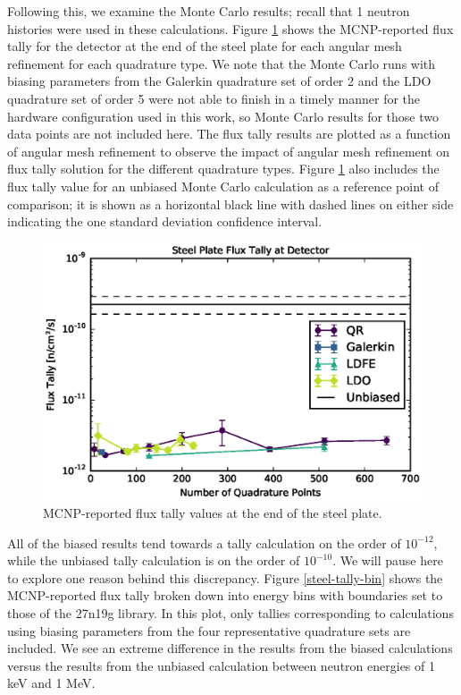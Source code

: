 \clearpage
Following this, we examine the Monte Carlo results; recall that 1 neutron histories were
used in these calculations. Figure \ref{steel-cad-tally} shows
the MCNP-reported flux tally for the detector at the end of the steel plate for each
angular mesh refinement for each quadrature type. We note that the Monte Carlo runs
with biasing parameters from the Galerkin quadrature set of order 2 and the LDO
quadrature set of order 5 were not able to finish in a timely manner for the hardware
configuration used in this work, so Monte Carlo results for those two data points are
not included here. The flux tally results are plotted as a function of angular mesh 
refinement to observe the impact of angular mesh refinement on flux tally solution 
for the different quadrature types. Figure \ref{steel-cad-tally} also includes the 
flux tally value for an unbiased Monte Carlo calculation as a reference point of
comparison; it is shown as a horizontal black line with dashed lines on either side indicating 
the one standard deviation confidence interval.

\begin{figure}[!hbt]
\centering
\includegraphics[max height=0.445\textheight]{img/steel-plots/mcnp/cadis-tally-4.eps}
\caption{MCNP-reported flux tally values at the end of the steel plate.}
\label{steel-cad-tally}
\end{figure}

All of the biased results tend towards a tally calculation on the order of 
$10^{-12}$, while the unbiased tally calculation is on the order of $10^{-10}$. We
will pause here to explore one reason behind this discrepancy. Figure 
\ref{steel-tally-bin} shows the MCNP-reported flux tally broken down into energy bins
with boundaries set to those of the 27n19g library. In this plot, only tallies corresponding
to calculations using biasing parameters from the four representative quadrature sets are 
included. We see an extreme difference in 
the results from the biased calculations versus the results from the unbiased 
calculation between neutron energies of 1 keV and 1 MeV. \clearpage

